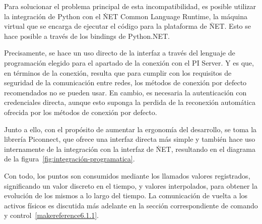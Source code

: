 Para solucionar el problema principal de esta incompatibilidad, es posible utilizar la integración de Python con el \.NET Common Language Runtime, la máquina virtual que se encarga de ejecutar el código para la plataforma de \.NET\@. Esto se hace posible a través de los bindings de Python.NET\@.

Precisamente, se hace un uso directo de la interfaz a través del lenguaje de programación elegido para el apartado de la conexión con el PI Server. Y es que, en términos de la conexión, resulta que para cumplir con los requisitos de seguridad de la comunicación entre redes, los métodos de conexión por defecto recomendados no se pueden usar. En cambio, es necesaria la autenticación con credenciales directa, aunque esto suponga la perdida de la reconexión automática ofrecida por los métodos de conexión por defecto.

Junto a ello, con el propósito de aumentar la ergonomía del desarrollo, se toma la librería Piconnect, que ofrece una interfaz directa más simple y también hace uso internamente de la integración con la interfaz de \.NET, resultando en el diagrama de la figura~\ref{fig:integración-programatica}.

Con todo, los puntos son consumidos mediante los llamados valores registrados, significando un valor discreto en el tiempo, y valores interpolados, para obtener la evolución de los mismos a lo largo del tiempo. La comunicación de vuelta a los activos físicos es discutida más adelante en la sección correspondiente de comando y control~\ref{makereference6.1.1}.

